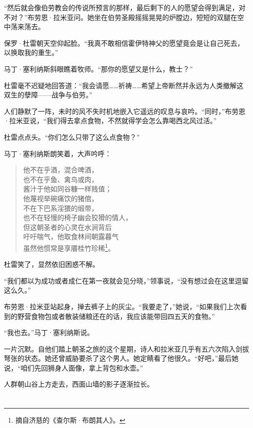 \documentclass[AutoFakeBold=true]{book}
\begin{document}
``然后就会像伯劳教会的传说所预言的那样，最后剩下的人的愿望会得到满足，对不对？''布劳恩·拉米亚问。她坐在伯劳圣殿摇摇晃晃的炉膛边，短短的双腿在空中荡来荡去。

保罗·杜雷朝天空仰起脸。``我真不敢相信霍伊特神父的愿望竟会是让自己死去，以换取我的重生。''

马丁·塞利纳斯斜眼瞧着牧师。``那你的愿望又是什么，教士？''

杜雷毫不迟疑地回答道：``我会请愿……祈祷……希望上帝断然并永远为人类撤解这双生的孽障——战争与伯劳。''

人们静默了一阵，未时的风不失时机地嵌入它遥远的叹息与哀吟。``同时，''布劳恩·拉米亚说，``我们得去拿点食物，不然就得学会怎么靠喝西北风过活。''

杜雷点点头。``你们怎么只带了这么点食物？''

马丁·塞利纳斯朗笑着，大声吟呼：

\begin{quote}
	{\kaishu 他不在乎酒，混合啤酒，\\
	也不在乎鱼、禽鸟或肉，\\
	酱汁于他如同谷糠一样贱值；\\
	他蔑视举碗痛饮的猪倌，\\
	不在下巴系淫猥的缎带，\\
	也不在轻慢的椅子幽会狡猾的情人，\\
	但这朝圣者的心灵在水涧背后\\
	吁吁喘气，他取食林间朝露暮气\\
	虽然他惯常是享餍桂竹珍稀}\footnote{摘自济慈的《查尔斯·布朗其人》。}。
\end{quote}

杜雷笑了，显然依旧困惑不解。

``我们都以为成功或者成仁在第一夜就会见分晓，''领事说，``没有想过会在这里逗留这么久。''

布劳恩·拉米亚站起身，掸去裤子上的灰尘。``我要走了，''她说，``如果我们上次看到的野营食物包或者散装储粮还在的话，我应该能带回四五天的食物。''

``我也去。''马丁·塞利纳斯说。

一片沉默。自他们踏上朝圣之旅的这个星期，诗人和拉米亚几乎有五六次陷入剑拔弩张的状态。她还曾威胁要杀了这个男人。她定睛看了他很久。``好吧，''最后她说，``咱们先回狮身人面像，拿上背包和水壶。''

人群朝山谷上方走去，西面山墙的影子逐渐拉长。

\chapter{}
\end{document}
